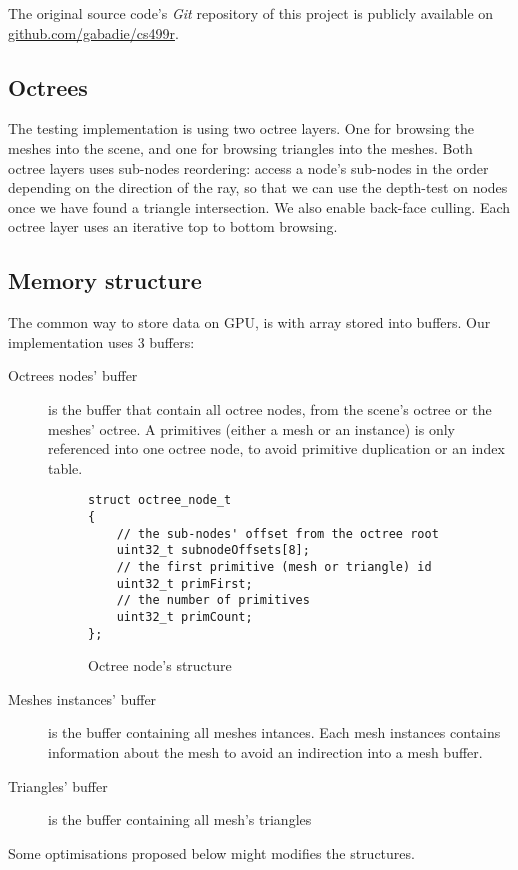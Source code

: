 The original source code's \textit{Git} repository of this project is publicly
available on \href{http://github.com/gabadie/cs499r}{github.com/gabadie/cs499r}.

\subsection{Octrees}
The testing implementation is using two octree layers. One for browsing the meshes
into the scene, and one for browsing triangles into the meshes. Both octree layers
uses sub-nodes reordering: access a node's sub-nodes in the order depending on
the direction of the ray, so that we can use the depth-test on nodes once we
have found a triangle intersection. We also enable back-face culling. Each octree
layer uses an iterative top to bottom browsing.

\subsection{Memory structure}
The common way to store data on GPU, is with array stored into buffers.
Our implementation uses 3 buffers:
\begin{description}
    \item[Octrees nodes' buffer] is the buffer that contain all octree nodes,
        from the scene's octree or the meshes' octree. A primitives (either a
        mesh or an instance) is only referenced into one octree node, to avoid
        primitive duplication or an index table.
        \begin{figure}[H]
            \centering
            \begin{lstlisting}
struct octree_node_t
{
    // the sub-nodes' offset from the octree root
    uint32_t subnodeOffsets[8];
    // the first primitive (mesh or triangle) id
    uint32_t primFirst;
    // the number of primitives
    uint32_t primCount;
};
            \end{lstlisting}
            \caption{Octree node's structure}
            \label{code:octree_node_struct}
        \end{figure}
    \item[Meshes instances' buffer] is the buffer containing all meshes intances.
        Each mesh instances contains information about the mesh to avoid an
        indirection into a mesh buffer.
    \item[Triangles' buffer] is the buffer containing all mesh's triangles
\end{description}
Some optimisations proposed below might modifies the structures.

